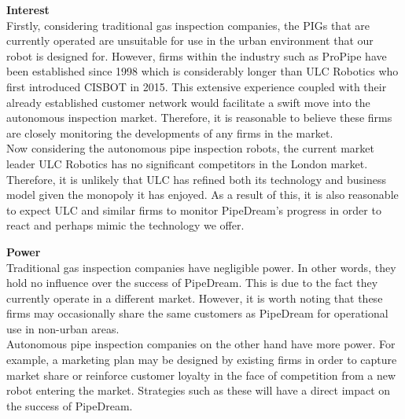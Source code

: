 \documentclass[11pt]{article}		%
\begin{document}
            \textbf{Interest}\\
            Firstly, considering traditional gas inspection companies, the PIGs that are currently operated are unsuitable for use in the urban environment that our robot is designed for. However, firms within the industry such as ProPipe have been established since 1998 which is considerably longer than ULC Robotics who first introduced CISBOT in 2015. This extensive experience coupled with their already established customer network would facilitate a swift move into the autonomous inspection market. Therefore, it is reasonable to believe these firms are closely monitoring the developments of any firms in the market. \\
            \hspace*{3ex}Now considering the autonomous pipe inspection robots, the current market leader ULC Robotics has no significant competitors in the London market. Therefore, it is unlikely that ULC has refined both its technology and business model given the monopoly it has enjoyed. As a result of this, it is also reasonable to expect ULC and similar firms to monitor PipeDream's progress in order to react and perhaps mimic the technology we offer. 
            
            \textbf{Power}\\
            Traditional gas inspection companies have negligible power. In other words, they hold no influence over the success of PipeDream. This is due to the fact they currently operate in a different market. However, it is worth noting that these firms may occasionally share the same customers as PipeDream for operational use in non-urban areas. \\
            \hspace*{3ex}Autonomous pipe inspection companies on the other hand have more power. For example, a marketing plan may be designed by existing firms in order to capture market share or reinforce customer loyalty in the face of competition from a new robot entering the market. Strategies such as these will have a direct impact on the success of PipeDream. 
            
\end{document}

